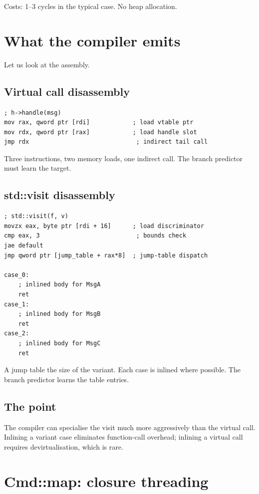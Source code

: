 Costs: 1--3 cycles in the typical case. No heap allocation.

\section{What the compiler emits}

Let us look at the assembly.

\subsection*{Virtual call disassembly}

\begin{lstlisting}
; h->handle(msg)
mov rax, qword ptr [rdi]            ; load vtable ptr
mov rdx, qword ptr [rax]            ; load handle slot
jmp rdx                              ; indirect tail call
\end{lstlisting}

Three instructions, two memory loads, one indirect call. The
branch predictor must learn the target.

\subsection*{std::visit disassembly}

\begin{lstlisting}
; std::visit(f, v)
movzx eax, byte ptr [rdi + 16]      ; load discriminator
cmp eax, 3                           ; bounds check
jae default
jmp qword ptr [jump_table + rax*8]  ; jump-table dispatch

case_0:
    ; inlined body for MsgA
    ret
case_1:
    ; inlined body for MsgB
    ret
case_2:
    ; inlined body for MsgC
    ret
\end{lstlisting}

A jump table the size of the variant. Each case is inlined
where possible. The branch predictor learns the table entries.

\subsection*{The point}

The compiler can specialise the visit much more aggressively
than the virtual call. Inlining a variant case eliminates
function-call overhead; inlining a virtual call requires
devirtualisation, which is rare.

\section{Cmd::map: closure threading}

